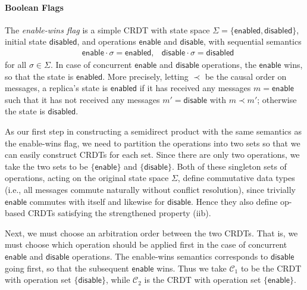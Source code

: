 \documentclass[acmsmall,nonacm,12pt]{acmart}
\newcommand{\mc}[1]{\ensuremath{\mathcal{#1}}}
\newcommand{\msf}[1]{\ensuremath{\mathsf{#1}}}
\theoremstyle{plain}
\theoremstyle{definition}
\begin{document}
\paragraph{Boolean Flags}
The \textit{enable-wins flag} \cite{riak_datatypes} is a simple CRDT with state space $\Sigma = \{\msf{enabled}, \msf{disabled}\}$, initial state $\msf{disabled}$, and operations $\msf{enable}$ and $\msf{disable}$, with sequential semantics
\begin{align*}
&\msf{enable} \cdot \sigma = \msf{enabled}, &\msf{disable} \cdot \sigma = \msf{disabled}
\end{align*}
for all $\sigma \in \Sigma$.  In case of concurrent $\msf{enable}$ and $\msf{disable}$ operations, the $\msf{enable}$ wins, so that the state is $\msf{enabled}$.  More precisely, letting $\prec$ be the causal order on messages, a replica's state is $\msf{enabled}$ if it has received any messages $m = \msf{enable}$ such that it has not received any messages $m' = \msf{disable}$ with $m \prec m'$; otherwise the state is $\msf{disabled}$.

As our first step in constructing a semidirect product with the same semantics as the enable-wins flag, we need to partition the operations into two sets so that we can easily construct CRDTs for each set.  Since there are only two operations, we take the two sets to be $\{\msf{enable}\}$ and $\{\msf{disable}\}$.  Both of these singleton sets of operations, acting on the original state space $\Sigma$, define commutative data types (i.e., all messages commute naturally without conflict resolution), since trivially $\msf{enable}$ commutes with itself and likewise for $\msf{disable}$.  Hence they also define op-based CRDTs satisfying the strengthened property (iib).

Next, we must choose an arbitration order between the two CRDTs.  That is, we must choose which operation should be applied first in the case of concurrent $\msf{enable}$ and $\msf{disable}$ operations.  The enable-wins semantics corresponds to $\msf{disable}$ going first, so that the subsequent $\msf{enable}$ wins.  Thus we take $\mc{C}_1$ to be the CRDT with operation set $\{\msf{disable}\}$, while $\mc{C}_2$ is the CRDT with operation set $\{\msf{enable}\}$.
\end{document}
